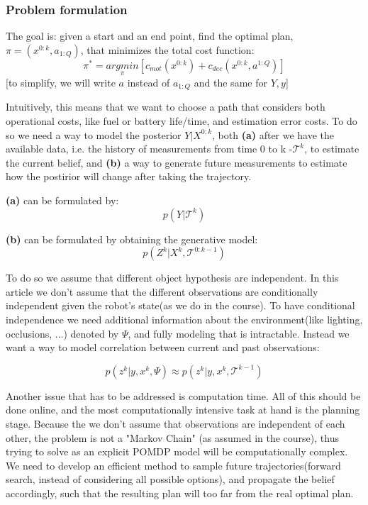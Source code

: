 \documentclass{article}
\begin{document}
	\subsubsection{Problem formulation}
	The goal is:
	given a start and an end point,
	find the optimal plan, $\pi=(x^{0:k},a_{1:Q})$, that minimizes the total cost function:
	\begin{equation}
	\pi^* = \underset{\pi}{argmin}[c_{mot}(x^{0:k}) + c_{dec}(x^{0:k},a^{1:Q})]
	\end{equation}
	[to simplify, we will write $a$ instead of $a_{1:Q}$ and the same for $Y,y$]
	
	Intuitively, this means that we want to choose a path that considers both operational costs, like fuel or battery life/time, and estimation error costs.
	To do so we need a way to model the posterior $Y|X^{0:k}$, both \textbf{(a)} after we have the available data, i.e. the history of measurements from time 0 to k -$\mathcal{T}^k$, to estimate the current belief,
	and \textbf{(b)} a way to generate future measurements to estimate how the postirior will change after taking the trajectory.
	
	\textbf{(a)} can be formulated by:
	\begin{equation}
	p(Y|\mathcal{T}^k)
	\end{equation}
	
	\textbf{(b)} can be formulated by obtaining the generative model:
	\begin{equation}
	p(Z^k|X^k,\mathcal{T}^{0:k-1})
	\end{equation}
	
	To do so we assume that different object hypothesis are independent. In this article we don't assume that the different observations are conditionally independent given the robot's state(as we do in the course). To have conditional independence we need additional information about the environment(like lighting, occlusions, ...) denoted by $\Psi$, and fully modeling that is intractable. Instead we want a way to model correlation between current and past observations:
	
	\begin{equation}
	p(z^k|y,x^k,\Psi) \approx p(z^k|y,x^k,\mathcal{T}^{k-1})
	\end{equation}
	
	Another issue that has to be addressed is computation time. All of this should be done online, and the most computationally intensive task at hand is the planning stage. Because the we don't assume that observations are independent of each other, the problem is not a "Markov Chain" (as assumed in the course), thus trying to solve as an explicit POMDP model will be computationally complex. We need to develop an efficient method to sample future trajectories(forward search, instead of considering all possible options), and propagate the belief accordingly, such that the resulting plan will too far from the real optimal plan.
	
\end{document}
